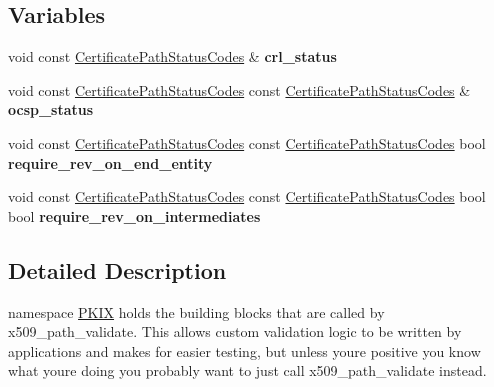 \subsection*{Variables}
\begin{DoxyCompactItemize}
\item 
\mbox{\label{namespace_botan_1_1_p_k_i_x_a44fb410b4f57b3cb8cbf7cfb31ce9a24}} 
void const \hyperlink{namespace_botan_a013252aabcb201e0d27b60b1e690886b}{Certificate\+Path\+Status\+Codes} \& {\bfseries crl\+\_\+status}
\item 
\mbox{\label{namespace_botan_1_1_p_k_i_x_abd1a7e92082beda13ef61dd3bc2cb220}} 
void const \hyperlink{namespace_botan_a013252aabcb201e0d27b60b1e690886b}{Certificate\+Path\+Status\+Codes} const \hyperlink{namespace_botan_a013252aabcb201e0d27b60b1e690886b}{Certificate\+Path\+Status\+Codes} \& {\bfseries ocsp\+\_\+status}
\item 
\mbox{\label{namespace_botan_1_1_p_k_i_x_ab7a891ad4c6e2a83e1cdd7bf4be0d532}} 
void const \hyperlink{namespace_botan_a013252aabcb201e0d27b60b1e690886b}{Certificate\+Path\+Status\+Codes} const \hyperlink{namespace_botan_a013252aabcb201e0d27b60b1e690886b}{Certificate\+Path\+Status\+Codes} bool {\bfseries require\+\_\+rev\+\_\+on\+\_\+end\+\_\+entity}
\item 
\mbox{\label{namespace_botan_1_1_p_k_i_x_a7693a8b765b069367dd8f2c8cbc4b2d0}} 
void const \hyperlink{namespace_botan_a013252aabcb201e0d27b60b1e690886b}{Certificate\+Path\+Status\+Codes} const \hyperlink{namespace_botan_a013252aabcb201e0d27b60b1e690886b}{Certificate\+Path\+Status\+Codes} bool bool {\bfseries require\+\_\+rev\+\_\+on\+\_\+intermediates}
\end{DoxyCompactItemize}


\subsection{Detailed Description}
namespace \hyperlink{namespace_botan_1_1_p_k_i_x}{P\+K\+IX} holds the building blocks that are called by x509\+\_\+path\+\_\+validate. This allows custom validation logic to be written by applications and makes for easier testing, but unless you\textquotesingle{}re positive you know what you\textquotesingle{}re doing you probably want to just call x509\+\_\+path\+\_\+validate instead. 

